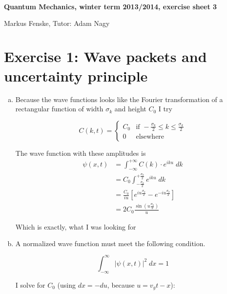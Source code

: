 \documentclass[a4paper,german,12pt,smallheadings]{scrartcl}
\begin{document}
\begin{center}
\bfseries %
\sffamily %
\vspace{-40pt}
Quantum Mechanics, winter term 2013/2014, exercise sheet 3

Markus Fenske, Tutor: Adam Nagy
\vspace{-10pt}
\end{center}

\section*{Exercise 1: Wave packets and uncertainty principle}

\begin{enumerate}[a)]
  \item
    Because the wave functions looks like the Fourier transformation of a
    rectangular function of width $\sigma_k$ and height $C_0$ I try

    \begin{equation*}
    C(k,t) = \begin{cases}
      C_0 &\text{if } - \frac{\sigma_k}{2} \le k \le \frac{\sigma_k}{2} \\
      0   &\text{elsewhere}
      \end{cases}
    \end{equation*}

    The wave function with these amplitudes is
    \begin{align*}
      \psi(x,t) &= \int_{- \infty}^{+ \infty} C(k) \cdot e^{iku} \; dk \\
      &= C_0 \int_{- \frac{\sigma_k}{2}}^{+\frac{\sigma_k}{2}} e^{iku} \; dk \\
      &= \frac{C_0}{iu} \left[ e^{iu \frac{\sigma_k}{2}} - e^{-iu \frac{\sigma_k}{2}} \right] \\
      &= 2 C_0\frac{\sin \left(u \frac{\sigma_k}{2}\right)}{u}
    \end{align*}

    Which is exactly, what I was looking for

  \item
    A normalized wave function must meet the following condition.

    \begin{equation*}
      \int_{-\infty}^{\infty} |\psi(x,t)|^2 \; dx = 1
    \end{equation*}

    I solve for $C_0$ (using $dx = -du$, because $u = v_gt - x$):


\end{enumerate}
\end{document}
